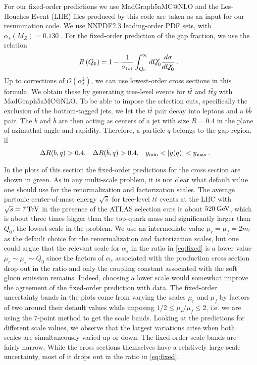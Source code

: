 \documentclass[11pt,a4paper]{article}
\begin{document}
For our fixed-order predictions we use {\sc MadGraph5\Q{_}aMC@NLO}  \cite{Alwall:2014hca} and the Les-Houches Event (LHE) files produced by this code are taken as an input for our resummation code. We use  NNPDF2.3  leading-order PDF sets, with $\alpha_s(M_Z)=0.130$ \cite{Ball:2012cx}. For the fixed-order prediction of the gap fraction, we use the relation
\begin{equation}\label{eq:fixed}
R\left(Q_0\right) = 1-  \frac{1}{\sigma_{\rm tot}} \int_{Q_0}^\infty dQ_0'\frac{d\sigma}{dQ_0'}\,.
\end{equation}
Up to corrections of $\mathcal{O}(\alpha_s^2)$, we can use lowest-order cross sections in this formula. We obtain these by generating tree-level events for $t\bar{t}$ and $t\bar{t} g$ with {\sc MadGraph5\Q{_}aMC@NLO}. To be able to impose the selection cuts, specifically the exclusion of the bottom-tagged jets, we let the $t\bar{t}$ pair decay into leptons and a $b\bar{b}$ pair. The $b$ and $\bar{b}$ are then acting as centers of a jet with size $R=0.4$ in the plane of azimuthal angle and rapidity. Therefore, a particle $q$ belongs to the gap region, if 
\begin{align} 
\Delta R (b,q)&>0.4,  & \Delta R (\bar{b},q)&>0.4,
&y_{\rm min} &<\left|y(q)\right|<y_{\rm max}  \,.\label{eq:outReg} 
\end{align}

In the plots of this section the fixed-order predictions for the cross section are shown in green. As in any multi-scale problem, it is not clear what default value one should use for the renormalization and factorization scales. The average partonic center-of-mass energy  $\sqrt{\hat{s}}$ for tree-level $t\bar{t}$ events at the LHC with $\sqrt{s}=7\, {\rm TeV}$ in the presence of the ATLAS selection cuts is about $520\,{\rm GeV}$, which is about three times bigger than the top-quark mass and significantly larger than $Q_0$, the lowest scale in the problem.    We use an intermediate value $\mu_r=\mu_f=2 m_t$ as the  default choice for the renormalization and factorization scales, but one could argue that the relevant scale for $\alpha_s$ in the ratio in \eqref{eq:fixed} is a lower value $\mu_r \sim \mu_s \sim Q_0$ since the factors of $\alpha_s$ associated with the production cross section drop out in the ratio and only the coupling constant associated with the soft gluon emission remains. Indeed, choosing a lower scale would somewhat improve the agreement of the fixed-order prediction with data. The fixed-order uncertainty bands in the plots come from varying the scales $\mu_r$ and $\mu_f$ by factors of two around their default values while imposing $1/2 \leq \mu_r/\mu_f \leq 2$, i.e. we are using the $7$-point method to get the scale bands.  Looking at the predictions for different scale values, we observe that the largest variations arise when both scales are simultaneously varied up or down. The fixed-order scale bands are fairly narrow. While the cross sections themselves have a relatively large scale uncertainty, most of it drops out in the ratio in \eqref{eq:fixed}. 
\end{document}
